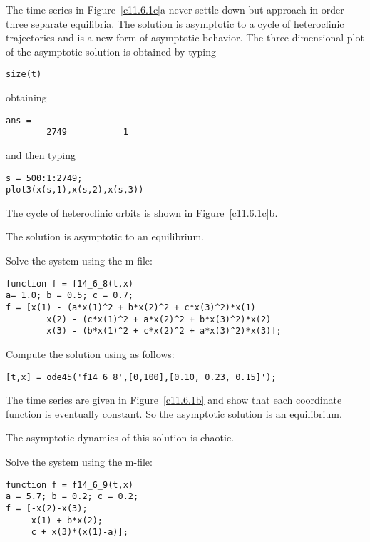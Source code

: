 \documentclass{ximera}
\begin{document}
The time series in Figure~\ref{c11.6.1c}a never settle down but approach in 
order three separate
equilibria.  The solution is asymptotic to a cycle of heteroclinic
trajectories and is a new form of asymptotic behavior.  The three 
dimensional plot of the asymptotic solution is obtained by typing
\begin{verbatim}
size(t)
\end{verbatim}
obtaining
\begin{verbatim}
ans =
        2749           1
\end{verbatim}
and then typing
\begin{verbatim}
s = 500:1:2749;
plot3(x(s,1),x(s,2),x(s,3))
\end{verbatim}
The cycle of heteroclinic orbits is shown in Figure~\ref{c11.6.1c}b.

\begin{figure}[htb]
     \centerline{%
     }
\end{figure}

 \ans The solution is asymptotic to an equilibrium.

\soln Solve the system using the m-file:
\begin{verbatim}
function f = f14_6_8(t,x)
a= 1.0; b = 0.5; c = 0.7;
f = [x(1) - (a*x(1)^2 + b*x(2)^2 + c*x(3)^2)*x(1) 
        x(2) - (c*x(1)^2 + a*x(2)^2 + b*x(3)^2)*x(2)
        x(3) - (b*x(1)^2 + c*x(2)^2 + a*x(3)^2)*x(3)];
\end{verbatim}
Compute the solution using \Matlab as follows:
\begin{verbatim}
[t,x] = ode45('f14_6_8',[0,100],[0.10, 0.23, 0.15]');
\end{verbatim}
The time series are given in Figure~\ref{c11.6.1b} and show
that each coordinate function is eventually constant.  So the asymptotic
solution is an equilibrium.

\begin{figure}[htb]
     \centerline{%
     }
\end{figure}

  \ans The asymptotic dynamics of this solution is chaotic.

\soln Solve the system using the m-file:
\begin{verbatim}
function f = f14_6_9(t,x)
a = 5.7; b = 0.2; c = 0.2;
f = [-x(2)-x(3); 
     x(1) + b*x(2); 
     c + x(3)*(x(1)-a)];
\end{verbatim}
\end{document}
